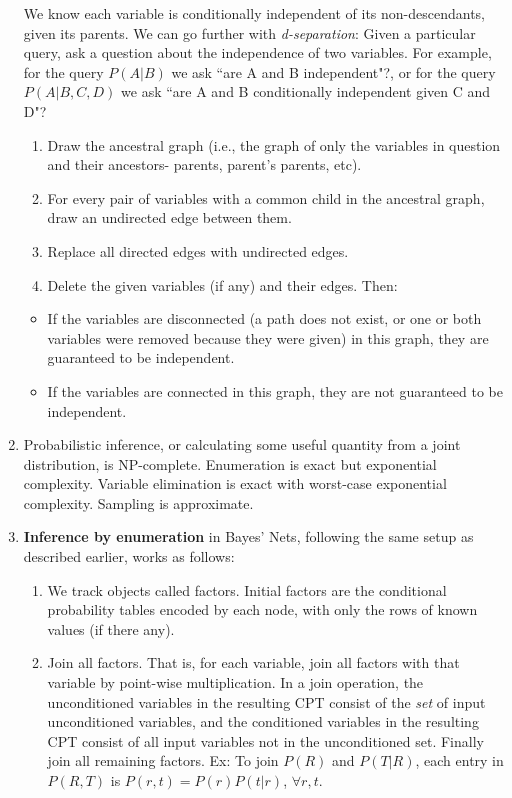 \documentclass[10pt]{article}
\begin{document}
\begin{multicols}{2}
\begin{addmargin}[0.8em]{0.5em}
\begin{enumerate}[label=(\alph*)]
        We know each variable is conditionally independent of its non-descendants, given its parents. We can go further with \textit{d-separation}: Given a particular query, ask a question about the independence of two variables. For example, for the query $P(A|B)$ we ask ``are A and B independent"?, or for the query $P(A|B,C,D)$ we ask ``are A and B conditionally independent given C and D"?
        \begin{enumerate}[label=\roman*.]
            \item Draw the ancestral graph (i.e., the graph of only the variables in question and their ancestors- parents, parent's parents, etc).
            \item For every pair of variables with a common child in the ancestral graph, draw an undirected edge between them.
            \item Replace all directed edges with undirected edges.
            \item Delete the given variables (if any) and their edges. Then: 
        \end{enumerate}
        \begin{itemize}
            \item If the variables are disconnected (a path does not exist, or one or both variables were removed because they were given) in this graph, they are guaranteed to be independent.
            \item If the variables are connected in this graph, they are not guaranteed to be independent.
        \end{itemize} 
        \item Probabilistic inference, or calculating some useful quantity from a joint distribution, is NP-complete. Enumeration is exact but exponential complexity. Variable elimination is exact with worst-case exponential complexity. Sampling is approximate.
        \item \textbf{Inference by enumeration} in Bayes' Nets, following the same setup as described earlier, works as follows: 
        \begin{enumerate}[label=\roman*.]
            \item We track objects called factors. Initial factors are the conditional probability tables encoded by each node, with only the rows of known values (if there any).
            \item Join all factors. That is, for each variable, join all factors with that variable by point-wise multiplication. In a join operation, the unconditioned variables in the resulting CPT consist of the \textit{set} of input unconditioned variables, and the conditioned variables in the resulting CPT consist of all input variables not in the unconditioned set. Finally  join all remaining factors. Ex: To join $P(R)$ and $P(T|R)$, each entry in $P(R,T)$ is $P(r,t)=P(r)P(t|r)$, $\forall r,t$.

\end{enumerate}
\end{enumerate}
\end{addmargin}
\end{multicols}
\end{document}
